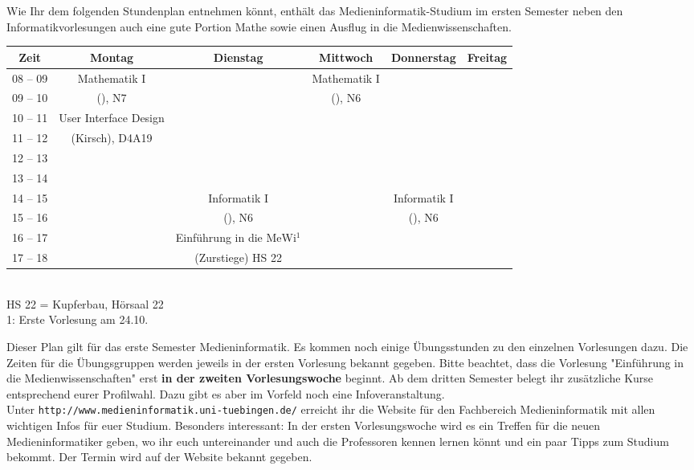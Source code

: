 
Wie Ihr dem folgenden Stundenplan entnehmen könnt, enthält das Medieninformatik-Studium im ersten
Semester neben den Informatikvorlesungen auch eine gute Portion Mathe sowie einen Ausflug in die Medienwissenschaften. 

\begin{center}
	\begin{tabular}{|c|c|c|c|c|c|} \hline
		Zeit      & 			Montag 		& Dienstag			& Mittwoch 			& Donnerstag 			& Freitag	 \\
		\hline\hline
		08 -- 09  & 		Mathematik I 	&  					& Mathematik I 		&  						&			\\
		\cline{1-1}\cline{3-3}\cline{5-6}
		09 -- 10  & 		(\Matheprof), N7& 					& (\Matheprof), N6  &  						&			\\
		\hline
		10 -- 11  &	User Interface Design	&					&					&						&			\\
		\cline{1-1}\cline{3-6}
		11 -- 12 & 	(Kirsch), D4A19			&  					&					&			 			& 			\\
		\hline
		12 -- 13 & 							&  					& 				    & 						& 			 \\
		\hline
		13 -- 14 & 							& 					&   				 & 						& 			 \\
		\hline
		14 -- 15 & 							& Informatik I 		& 					& Informatik I 			& 				\\
		\cline{1-2}\cline{4-4}\cline{6-6}
		15 -- 16 &							& (\Infoprof), N6 	& 					& (\Infoprof), N6 		& 				\\
		\hline
		16 -- 17 & 	 						&  	Einführung in die MeWi$^1$ & 		&						&\\
		\cline{1-2}\cline{4-6}
		17 -- 18 & 	 						& (Zurstiege) HS 22 &					& 						& \\
		\hline
	\end{tabular}\\
\scriptsize HS 22 = Kupferbau, Hörsaal 22 \\
1: Erste Vorlesung am 24.10.

\end{center}

Dieser Plan gilt für das erste Semester Medieninformatik. 
Es kommen noch einige Übungsstunden
zu den einzelnen Vorlesungen dazu. Die Zeiten für die Übungsgruppen werden jeweils in der ersten Vorlesung bekannt gegeben.
Bitte beachtet, dass die Vorlesung "Einführung in die Medienwissenschaften" erst \textbf{in der zweiten Vorlesungswoche} beginnt.
Ab dem dritten Semester belegt ihr zusätzliche Kurse entsprechend eurer Profilwahl. Dazu gibt es aber im Vorfeld noch eine Infoveranstaltung.\\
Unter \texttt{http://www.medieninformatik.uni-tuebingen.de/} erreicht ihr die Website für den Fachbereich Medieninformatik mit allen wichtigen Infos für euer Studium. Besonders interessant: In der ersten Vorlesungswoche wird es ein Treffen für die neuen Medieninformatiker geben, wo ihr euch untereinander und auch die Professoren kennen lernen könnt und ein paar Tipps zum Studium bekommt. Der Termin wird auf der Website bekannt gegeben. %
